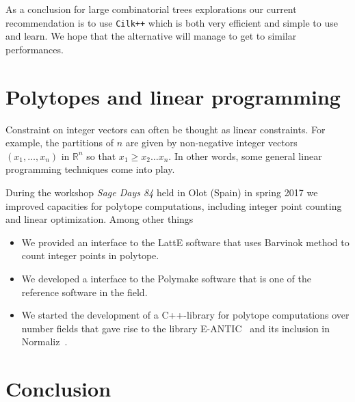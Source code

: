 \documentclass{deliverablereport}
\newcommand{\CilkP}{\texttt{Cilk++}\xspace}
\begin{document}
As a conclusion for large combinatorial trees explorations our current
recommendation is to use \CilkP which is both very efficient and simple to use
and learn. We hope that the alternative will manage to get to similar
performances.


\section{Polytopes and linear programming}

Constraint on integer vectors can often be thought as linear constraints.
For example, the partitions of $n$ are given by non-negative integer
vectors $(x_1, \ldots, x_n)$ in $\mathbb{R}^n$ so that $x_1 \geq x_2 \ldots x_n$.
In other words, some general linear programming techniques come into
play.

During the \ODK workshop \textit{Sage Days 84} held in Olot (Spain) in spring
2017 we improved \Sage capacities for polytope computations, including
integer point counting and linear optimization. Among other things
\begin{itemize}
\item We provided an interface to the LattE software that uses Barvinok
method to count integer points in polytope.
\item We developed a \Sage interface to the Polymake software that is
one of the reference software in the field.
\item We started the development of a C++-library for polytope computations
over number fields that gave rise to the library E-ANTIC~\cite{eantic-code}
 and its inclusion in Normaliz~\cite{normaliz-code}.
\end{itemize}
        

\section{Conclusion}



\printbibliography
\end{document}
